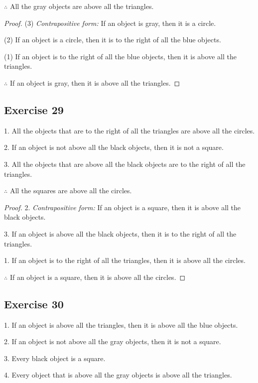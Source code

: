 \documentclass[14pt]{extarticle}
\begin{document}
$\therefore$ All the gray objects are above all the triangles.

\begin{proof}
    (3) {\it Contrapositive form:} If an object is gray, then it is a circle.

    (2) If an object is a circle, then it is to the right of all the blue objects.

    (1) If an object is to the right of all the blue objects, then it is above all the triangles.

    $\therefore$ If an object is gray, then it is above all the triangles.
\end{proof}

\subsection{Exercise 29}
1. All the objects that are to the right of all the triangles are above all the circles.

2. If an object is not above all the black objects, then it is not a square.

3. All the objects that are above all the black objects are to the right of all the triangles.

$\therefore$ All the squares are above all the circles.

\begin{proof}
    2. {\it Contrapositive form:} If an object is a square, then it is above all the black objects.

    3. If an object is above all the black objects, then it is to the right of all the triangles.

    1. If an object is to the right of all the triangles, then it is above all the circles.

    $\therefore$ If an object is a square, then it is above all the circles.
\end{proof}

\subsection{Exercise 30}
1. If an object is above all the triangles, then it is above all the blue objects.

2. If an object is not above all the gray objects, then it is not a square.

3. Every black object is a square.

4. Every object that is above all the gray objects is above all the triangles.
\end{document}
